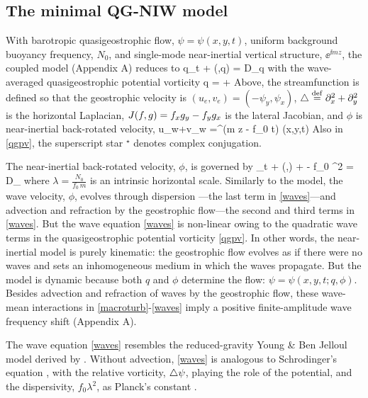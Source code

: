 \documentclass{jfm}
\begin{document}
\subsection{The \cite{xie_vanneste2015} minimal QG-NIW model}

With barotropic quasigeostrophic flow, $\psi=\psi(x,y,t)$,
uniform background buoyancy frequency, $N_0$, and
single-mode near-inertial vertical structure, $\ee^{\ii m z}$, the \cite{xie_vanneste2015}
coupled model (Appendix A) reduces to
\beq
\label{macroturb}
q_t + \sJ(\psi,q) = D_q\com
\eeq
with the wave-averaged quasigeostrophic potential vorticity
\beq
\label{qgpv}
q = \lap \psi +
                 \per
\eeq
Above, the streamfunction is defined so that the geostrophic velocity is
$(u_e, v_e) = (-\psi_y, \psi_x)$, $\triangle \stackrel{\mathrm{def}}{=} \partial_x^2 + \partial_y^2$ is the horizontal
Laplacian, $J(f,g)=f_x g_y - f_y g_x$ is the lateral Jacobian, and $\phi$
is near-inertial back-rotated velocity,
\beq
\label{niw_velocity}
u_w+\ii v_w  =\ee^{\ii (m z - f_0 t)} \phi(x,y,t)\per
\eeq
Also in \eqref{qgpv}, the superscript star $^\star$ denotes complex conjugation.

The near-inertial back-rotated velocity, $\phi$, is governed by
\beq
\label{waves}
\phi_t + \sJ(\psi,\phi) + \phi\lap \psi -  f_0 \lambda^2 \lap \phi
 = D_\phi\com
\eeq
where $\lambda = \tfrac{N_0}{f_0\, m}$  is an intrinsic horizontal scale.
Similarly to the \cite{young_benjelloul1997} model, the wave velocity, $\phi$,
evolves through dispersion ---the last term in \eqref{waves}---and
advection and refraction by the geostrophic flow---the second and third terms in
\eqref{waves}. But the wave equation \eqref{waves} is non-linear owing to the
quadratic wave terms in the quasigeostrophic potential vorticity \eqref{qgpv}. In other
words, the
\cite{young_benjelloul1997} near-inertial model is purely kinematic: the geostrophic
flow evolves as if there were no waves and sets an
inhomogeneous medium in which the waves propagate.
But the \cite{xie_vanneste2015} model is dynamic because both $q$ and $\phi$
determine the flow: $\psi=\psi(x,y,t; q, \phi)$. Besides advection and refraction of waves
by the geostrophic flow, these wave-mean interactions in \eqref{macroturb}-\eqref{waves}
imply a positive finite-amplitude wave frequency shift (Appendix A).

The wave equation \eqref{waves} resembles the reduced-gravity
Young \& Ben Jelloul model derived by  \cite{danioux_etal2015}. Without advection,
\eqref{waves} is analogous to Schrodinger's equation
\citep[e.g.,][ pg. 51]{landau_lifshitz2013}, with the relative vorticity, $\triangle\psi$,
playing the role of the
potential, and the dispersivity, $f_0\lambda^2$, as Planck's constant
\citep{danioux_etal2015}.
\end{document}
